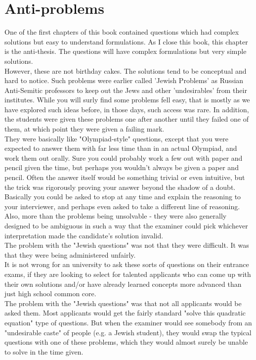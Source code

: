 \chapter{Anti-problems}
One of the first chapters of this book contained questions which had complex solutions but easy to understand formulations. As I close this book, this chapter is the anti-thesis. The questions will have complex formulations but very simple solutions.\\
However, these are not birthday cakes. The solutions tend to be conceptual and hard to notice. Such problems were earlier called 'Jewish Problems' as Russian Anti-Semitic professors to keep out the Jews and other 'undesirables' from their institutes. While you will surly find some problems fell easy, that is mostly as we have explored such ideas before, in those days, such access was rare. In addition, the students were given these problems one after another until they failed one of them, at which point they were given a failing mark.\\
They were basically like "Olympiad-style" questions, except that you were expected to answer them with far less time than in an actual Olympiad, and work them out orally. Sure you could probably work a few out with paper and pencil given the time, but perhaps you wouldn't always be given a paper and pencil. Often the answer itself would be something trivial or even intuitive, but the trick was rigorously proving your answer beyond the shadow of a doubt. Basically you could be asked to stop at any time and explain the reasoning to your interviewer, and perhaps even asked to take a different line of reasoning. Also, more than the problems being unsolvable - they were also generally designed to be ambiguous in such a way that the examiner could pick whichever interpretation made the candidate's solution invalid. \\
The problem with the "Jewish questions" was not that they were difficult. It was that they were being administered unfairly.\\
It is not wrong for an university to ask these sorts of questions on their entrance exams, if they are looking to select for talented applicants who can come up with their own solutions and/or have already learned concepts more advanced than just high school common core.\\
The problem with the "Jewish questions" was that not all applicants would be asked them. Most applicants would get the fairly standard "solve this quadratic equation" type of questions. But when the examiner would see somebody from an "undesirable caste" of people (e.g. a Jewish student), they would swap the typical questions with one of these problems, which they would almost surely be unable to solve in the time given.\\
